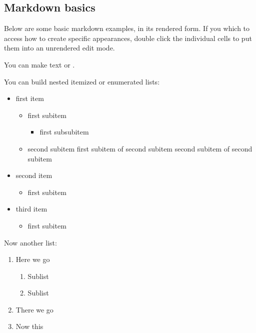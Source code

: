 \documentclass[letterpaper,10pt,english]{sphinxmanual}
\begin{document}
\subsection{Markdown basics}
\label{\detokenize{notebooks/Intro/EditCells:Markdown-basics}}
Below are some basic markdown examples, in its rendered form. If you which to access how to create specific appearances, double click the individual cells to put them into an unrendered edit mode.

You can make text  or .

You can build nested itemized or enumerated lists:
\begin{itemize}
\item {} 
first item
\begin{itemize}
\item {} 
first subitem
\begin{itemize}
\item {} 
first subsubitem

\end{itemize}

\item {} 
second subitem \sphinxhyphen{} first subitem of second subitem \sphinxhyphen{} second subitem of second subitem

\end{itemize}

\item {} 
second item
\begin{itemize}
\item {} 
first subitem

\end{itemize}

\item {} 
third item
\begin{itemize}
\item {} 
first subitem

\end{itemize}

\end{itemize}

Now another list:
\begin{enumerate}
%
\item {} 
Here we go
\begin{enumerate}
%
\item {} 
Sublist

\item {} 
Sublist

\end{enumerate}

\item {} 
There we go

\item {} 
Now this

\end{enumerate}
\end{document}
